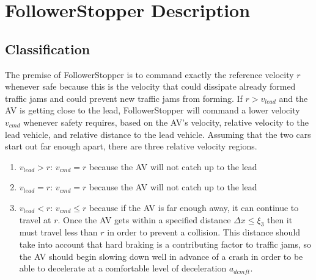 \documentclass[conference]{IEEEtran}
\begin{document}
\section{FollowerStopper Description}

\subsection{Classification}
The premise of FollowerStopper is to command exactly the reference velocity $r$ whenever safe because this is the velocity that could dissipate already formed traffic jams and could prevent new traffic jams from forming. If $r>v_{lead}$ and the AV is getting close to the lead, FollowerStopper will command a lower velocity $v_{cmd}$ whenever safety requires, based on the AV's velocity, relative velocity to the lead vehicle, and relative distance to the lead vehicle. Assuming that the two cars start out far enough apart, there are three relative velocity regions.
\begin{enumerate}
\item $v_{lead} > r$: $v_{cmd}=r$ because the AV will not catch up to the lead
\item $v_{lead} = r$: $v_{cmd}=r$ because the AV will not catch up to the lead
\item $v_{lead}<r$: $v_{cmd}\leq r$ because if the AV is far enough away, it can continue to travel at $r$. Once the AV gets within a specified distance $\Delta x \leq \xi_3$ then it must travel less than $r$ in order to prevent a collision. This distance should take into account that hard braking is a contributing factor to traffic jams, so the AV should begin slowing down well in advance of a crash in order to be able to decelerate at a comfortable level of deceleration $a_{dcmft}$.
\end{enumerate}
\end{document}
